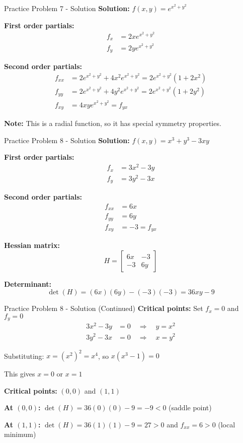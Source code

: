 \documentclass[aspectratio=169]{beamer}
\begin{document}
\begin{frame}{Practice Problem 7 - Solution}
\textbf{Solution:} $f(x,y) = e^{x^2 + y^2}$

\textbf{First order partials:}
\begin{align*}
    f_x &= 2xe^{x^2 + y^2} \\
    f_y &= 2ye^{x^2 + y^2}
\end{align*}

\textbf{Second order partials:}
\begin{align*}
    f_{xx} &= 2e^{x^2 + y^2} + 4x^2e^{x^2 + y^2} = 2e^{x^2 + y^2}(1 + 2x^2) \\
    f_{yy} &= 2e^{x^2 + y^2} + 4y^2e^{x^2 + y^2} = 2e^{x^2 + y^2}(1 + 2y^2) \\
    f_{xy} &= 4xye^{x^2 + y^2} = f_{yx}
\end{align*}

\textbf{Note:} This is a radial function, so it has special symmetry properties.
\end{frame}

\begin{frame}{Practice Problem 8 - Solution}
\textbf{Solution:} $f(x,y) = x^3 + y^3 - 3xy$

\textbf{First order partials:}
\begin{align*}
    f_x &= 3x^2 - 3y \\
    f_y &= 3y^2 - 3x
\end{align*}

\textbf{Second order partials:}
\begin{align*}
    f_{xx} &= 6x \\
    f_{yy} &= 6y \\
    f_{xy} &= -3 = f_{yx}
\end{align*}

\textbf{Hessian matrix:}
\[H = \begin{bmatrix} 
6x & -3 \\
-3 & 6y
\end{bmatrix}\]

\textbf{Determinant:}
\[\det(H) = (6x)(6y) - (-3)(-3) = 36xy - 9\]
\end{frame}

\begin{frame}{Practice Problem 8 - Solution (Continued)}
\textbf{Critical points:} Set $f_x = 0$ and $f_y = 0$
\begin{align*}
    3x^2 - 3y &= 0 \quad \Rightarrow \quad y = x^2 \\
    3y^2 - 3x &= 0 \quad \Rightarrow \quad x = y^2
\end{align*}

Substituting: $x = (x^2)^2 = x^4$, so $x(x^3 - 1) = 0$

This gives $x = 0$ or $x = 1$

\textbf{Critical points:} $(0,0)$ and $(1,1)$

\textbf{At $(0,0)$:} $\det(H) = 36(0)(0) - 9 = -9 < 0$ (saddle point)

\textbf{At $(1,1)$:} $\det(H) = 36(1)(1) - 9 = 27 > 0$ and $f_{xx} = 6 > 0$ (local minimum)
\end{frame}
\end{document}
